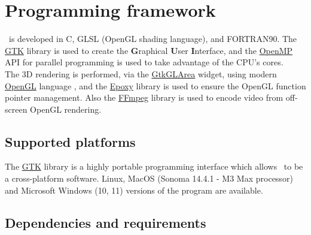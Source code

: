 \chapter{Programming framework}
\label{frame}

\atomes\ is developed in C, GLSL (OpenGL shading language), and  FORTRAN90. 
The \href{https://www.gtk.org/}{GTK} \cite{gtk} library is used to create the {\bf{G}}raphical {\bf{U}}ser {\bf{I}}nterface, and the \href{https://www.openmp.org/}{OpenMP} \cite{OpenMP} API for parallel programming is used to take advantage of the CPU's cores. \\
The 3D rendering is performed, via the \href{https://developer.gnome.org/gtk3/stable/GtkGLArea.html}{GtkGLArea} widget, using modern \href{https://www.opengl.org/}{OpenGL} language \cite{OpenGL},
and the \href{https://github.com/anholt/libepoxy}{Epoxy} library is used to ensure the OpenGL function pointer management. 
Also the  \href{https://www.ffmpeg.org/}{FFmpeg} \cite{ffmpeg} library is used to encode video from off-screen OpenGL rendering. 

\section{Supported platforms}

The \href{https://www.gtk.org/}{GTK} library is a highly portable programming interface which allows \atomes\ to be a cross-platform software. 
Linux, MacOS (Sonoma 14.4.1 - M3 Max processor) and Microsoft Windows (10, 11) versions of the program are available. 

\section{Dependencies and requirements}

